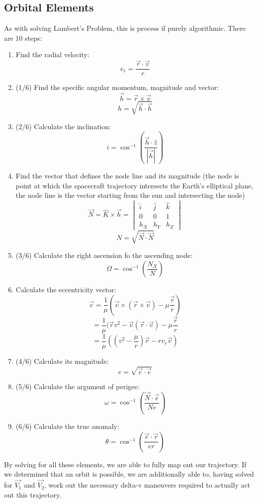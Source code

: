 \documentclass{article}
\numberwithin{figure}{section}
\begin{document}
\subsection*{Orbital Elements}
As with solving Lambert's Problem, this is process if purely algorithmic. There are 10 steps:
\begin{enumerate}
    \item Find the radial velocity:
    \[
v_r = \frac{\vec{r} \cdot \vec{v}}{r}
\]
    \item (1/6) Find the specific angular momentum, magnitude and vector:
    \[
\vec{h} = \vec{r} \times \vec{v}
\]
\[
h = \sqrt{\vec{h} \cdot \vec{h}}
\]
    \item (2/6) Calculate the inclination:
    \[
i = \cos^{-1} \left( \frac{\vec{h} \cdot \hat{z}}{|\vec{h}|} \right)
\]
    \item Find the vector that defines the node line and its magnitude (the node is point at which the spacecraft trajectory intersects the Earth's elliptical plane, the node line is the vector starting from the sun and intersecting the node)
\[
\vec{N} = \hat{K} \times \vec{h} =
\begin{vmatrix}
\hat{i} & \hat{j} & \hat{k} \\
0 & 0 & 1 \\
h_X & h_Y & h_Z
\end{vmatrix}
\]
\[
N = \sqrt{\vec{N} \cdot \vec{N}}
\]
    \item (3/6) Calculate the right ascension fo the ascending node:
    \[
\Omega = \cos^{-1} \left( \frac{N_X}{N} \right)
\]
    \item Calculate the eccentricity vector:
\[
\vec{e} = \frac{1}{\mu} \left( \vec{v} \times (\vec{r} \times \vec{v}) - \mu \frac{\vec{r}}{r} \right)
\]
\[
= \frac{1}{\mu}(\vec{r}v^2-\vec{v}(\vec{r}\cdot\vec{v})-\mu\frac{\vec{r}}{r}
\]
\[
= \frac{1}{\mu}(( v^2 - \frac{\mu}{r})\vec{r} - rv_r\vec{v})
\]
    \item (4/6) Calculate its magnitude:
\[
e = \sqrt{\vec{e} \cdot \vec{e}} \]
    \item (5/6) Calculate the argument of perigee:
    \[
\omega = \cos^{-1} \left( \frac{\vec{N} \cdot \vec{e}}{N e} \right)
\]
    \item (6/6) Calculate the true anomaly:
    \[
\theta = \cos^{-1} \left( \frac{\vec{e} \cdot \vec{r}}{e r} \right)
\]
\end{enumerate}

By solving for all these elements, we are able to fully map out our trajectory. If we determined that an orbit is possible, we are additionally able to, having solved for \(\vec{V_1}\) and \(\vec{V_2}\), work out the necessary delta-v maneuvers required to actually act out this trajectory.
\end{document}
